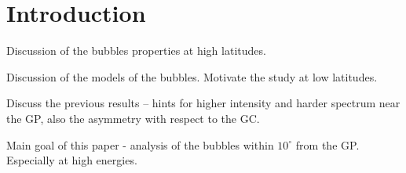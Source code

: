 \section{Introduction}

Discussion of the \Fermi bubbles properties at high latitudes.

Discussion of the models of the bubbles. Motivate the study at low latitudes.

Discuss the previous results -- hints for higher intensity and harder spectrum near the GP,
also the asymmetry with respect to the GC.

Main goal of this paper - analysis of the \Fermi bubbles within $10^\circ$ from the GP.
Especially at high energies.